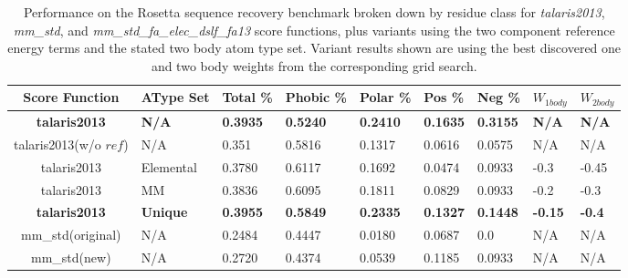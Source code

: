 \begin{table}[!htbp]

\fontsize{9pt}{9pt}
\selectfont

\begin{tabular}{c|llllllll}
Score Function & AType Set & Total \% & Phobic \% & Polar \% & Pos \% & Neg \% & $W_{1body}$ & $W_{2body}$\\
\hline
\textbf{talaris2013} & \textbf{N/A} & \textbf{0.3935} & \textbf{0.5240} & \textbf{0.2410} & \textbf{0.1635} & \textbf{0.3155} & \textbf{N/A} & \textbf{N/A}\\
talaris2013(w/o $ref$) & N/A & 0.351 & 0.5816 & 0.1317 & 0.0616 & 0.0575 & N/A & N/A\\
talaris2013 & Elemental & 0.3780 & 0.6117 & 0.1692 & 0.0474 & 0.0933 & -0.3 & -0.45\\
talaris2013 & MM & 0.3836 & 0.6095 & 0.1811 & 0.0829 & 0.0933 & -0.2 & -0.3\\
\textbf{talaris2013} & \textbf{Unique} & \textbf{0.3955} & \textbf{0.5849} & \textbf{0.2335} & \textbf{0.1327} & \textbf{0.1448} & \textbf{-0.15} & \textbf{-0.4}\\
\hline
mm\_std(original) & N/A & 0.2484 & 0.4447 & 0.0180 & 0.0687 & 0.0 & N/A & N/A\\
mm\_std(new) & N/A & 0.2720 & 0.4374 & 0.0539 & 0.1185 & 0.0933 & N/A & N/A\\

\end{tabular}

\fontsize{10pt}{11pt}
\selectfont
\caption{Performance on the Rosetta sequence recovery benchmark broken down by residue class for \textit{talaris2013}, \textit{mm\_std}, and \textit{mm\_std\_fa\_elec\_dslf\_fa13} score functions, plus variants using the two component reference energy terms and the stated two body atom type set.
Variant results shown are using the best discovered one and two body weights from the corresponding grid search.}
\label{tab:performance}

\end{table}


